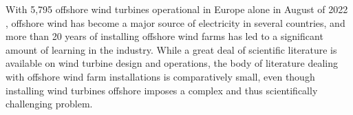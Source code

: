 \documentclass[wes, manuscript]{copernicus}
\begin{document}


\introduction  %

With 5,795 offshore wind turbines operational in Europe alone in August of 2022 \citep{windeuropeorg_offshore_2022},
offshore wind has become a major source of electricity in several countries, 
and more than 20 years of installing offshore wind farms has led to a significant
amount of learning in the industry. While a great deal of scientific 
literature is available on wind turbine design and operations, the body of 
literature dealing with offshore wind farm installations is 
comparatively small, even though installing wind turbines offshore imposes a
complex and thus scientifically challenging problem. 
\end{document}
